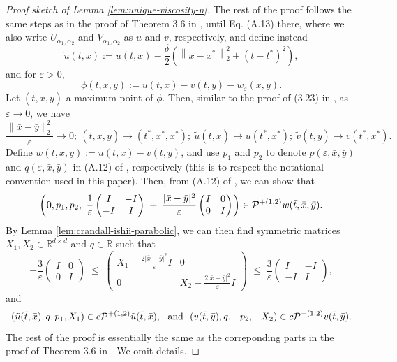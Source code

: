 \documentclass[11pt]{article}
\theoremstyle{definition}
\theoremstyle{plain}
\newcommand{\R}{\mathbb{R}}
\newcommand{\cP}{{\cal P}}
\newcommand{\veps}{\varepsilon}
\begin{document}
\begin{appendices}
\begin{proof}[Proof sketch of Lemma \ref{lem:unique-viscosity-n}]
The rest of the proof follows the same steps as in the proof of Theorem 3.6 in \cite{borkar2004ergodic}, 
until Eq. (A.13) there, where we also write $U_{\alpha_1,\alpha_2}$ and $V_{\alpha_1,\alpha_2}$ as $u$ and $v$, respectively, and define instead
\[
\tilde u(t,x) := u(t,x) - \frac{\delta}{2} \left(\left\|x-x^*\right\|_2^2 + (t-t^*)^2\right),
\]
and for $\veps > 0$,
\[
\phi(t,x,y) := \tilde u(t,x) - v(t,y) - w_{\veps}(x,y).
\]
Let $\left(\bar t, \bar x, \bar y\right)$ a maximum point of $\phi$. Then, similar to the proof of (3.23) in \cite{DupuisIshii1991}, as $\veps \to 0$, we have
\[
\frac{\|\bar x-\bar y\|^2_2}{\varepsilon} \to 0; \ (\bar t, \bar x, \bar y) \to (t^*, x^*, x^*); \ 
\tilde u (\bar t, \bar x) \to u(t^*, x^*); \ \tilde v (\bar t, \bar y) \to v(t^*, x^*).
\]
Define $w(t,x,y) := \tilde u(t,x) - v(t,y)$, and use $p_1$ and $p_2$ to denote $p(\veps, \bar x, \bar y)$ and $q(\veps, \bar x, \bar y)$
in (A.12) of \cite{borkar2004ergodic}, respectively (this is to respect the notational convention used in this paper). 
Then, from (A.12) of \cite{borkar2004ergodic}, we can show that 
\[
\left(0, p_1, p_2,\ \frac{1}{\varepsilon}
\begin{pmatrix}
I & -I\\
-I & I
\end{pmatrix}
\;+\;
\frac{\lvert \bar{x}-\bar{y}\rvert^{2}}{\varepsilon}
\begin{pmatrix}
I & 0\\
0 & I
\end{pmatrix}
\right)
\in \cP^{+(1,2)} w(\bar t, \bar{x},\bar{y}).
\]
By Lemma \ref{lem:crandall-ishii-parabolic}, we can then find symmetric matrices $X_1, X_2 \in \R^{d\times d}$ and $q\in \R$ such that 
\[
- \frac{3}{\veps}
\begin{pmatrix}
I & 0\\
0 & I
\end{pmatrix}
\;\le\;
\begin{pmatrix}
X_1-\frac{2\lvert \bar{x}-\bar{y}\rvert^{2}}{\varepsilon} I & 0\\
0 & X_2-\frac{2\lvert \bar{x}-\bar{y}\rvert^{2}}{\varepsilon} I
\end{pmatrix}
\;\le\;
\frac{3}{\veps}
\begin{pmatrix}
I & -I\\
-I & I
\end{pmatrix},
\]
and 
\[
(\tilde u(\bar t, \bar x), q, p_1, X_1) \in c\cP^{+(1,2)} \tilde u(\bar t, \bar x), \ \text{ and } \
(v(\bar t, \bar y), q, -p_2, -X_2) \in c\cP^{-(1,2)} v(\bar t, \bar y).
\]
The rest of the proof is essentially the same as the correponding parts in the proof of Theorem 3.6 in \cite{borkar2004ergodic}. We omit details.

\end{proof}
\end{appendices}
\end{document}
